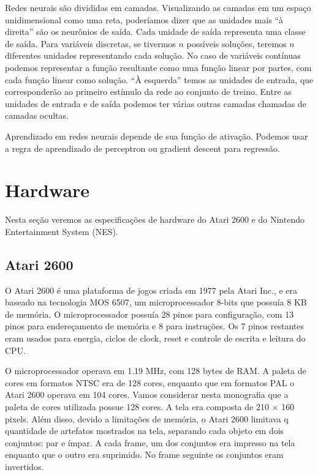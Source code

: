 \documentclass[a4paper,10pt]{article}
\theoremstyle{plain}
\begin{document}
Redes neurais são divididas em camadas. Visualizando as camadas em um espaço unidimensional como
uma reta, poderíamos dizer que as unidades mais ``à direita'' são os neurônios de saída. Cada
unidade de saída representa uma classe de saída. Para variáveis discretas, se tivermos $n$
possíveis soluções, teremos $n$ diferentes unidades representando cada solução. No caso de
variáveis contínuas podemos representar a função resultante como uma função linear por partes, com
cada função linear como solução. ``À esquerda'' temos as unidades de entrada, que corresponderão
ao primeiro estímulo da rede ao conjunto de treino. Entre as unidades de entrada e de saída podemos
ter várias outras camadas chamadas de camadas ocultas.

Aprendizado em redes neurais depende de sua função de ativação. Podemos usar a regra de aprendizado
de perceptron ou gradient descent para regressão.

\section{Hardware}

Nesta seção veremos as especificações de hardware do Atari 2600 e do Nintendo Entertainment System
(NES).

\subsection{Atari 2600}

O Atari 2600 é uma plataforma de jogos criada em 1977 pela Atari Inc., e era baseado na tecnologia
MOS 6507, um microprocessador 8-bits que possuía 8 KB de memória. O microprocessador possuía 28
pinos para configuração, com 13 pinos para endereçamento de memória e 8 para instruções. Os 7 pinos
restantes eram usados para energia, ciclos de clock, reset e controle de escrita e leitura do CPU.

O microprocessador operava em 1.19 MHz, com 128 bytes de RAM. A paleta de cores em formatos NTSC
era de 128 cores, enquanto que em formatos PAL o Atari 2600 operava em 104 cores. Vamos considerar
nesta monografia que a paleta de cores utilizada possue 128 cores. A tela era composta de 210
$\times$ 160 pixels. Além disso, devido a limitações de memória, o Atari 2600 limitava q quantidade
de artefatos mostrados na tela, separando cada objeto em dois conjuntos: par e ímpar. A cada frame,
um dos conjuntos era impresso na tela enquanto que o outro era suprimido. No frame seguinte os
conjuntos eram invertidos.
\end{document}
